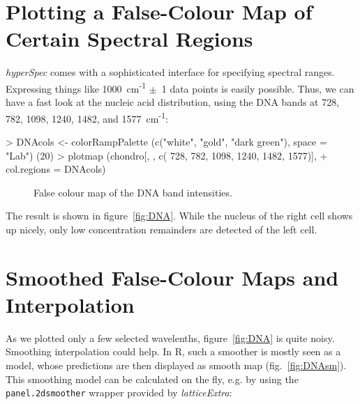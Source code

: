 \documentclass[english, a4paper, 10pt, headings=small, DIV11]{scrartcl}
\renewenvironment{Schunk}{\vspace{0pt}\begin{small}}{\end{small}\vspace{0pt}}
\newcommand{\Rfunction}[2][]{\texorpdfstring{\nohyphens{#1\texttt{#2}}}{#2}}
\newcommand{\Rpackage}[1]{\texorpdfstring{\nohyphens{\textit{#1}}}{#1}}
\newcommand{\Rclass}[1]{\texorpdfstring{\nohyphens{\textit{#1}}}{#1}}
\begin{document}
\section{Plotting a False-Colour Map of Certain Spectral Regions}

\Rclass{hyperSpec} comes with a sophisticated interface for specifying
spectral ranges. Expressing things like 1000~cm\textsuperscript{-1}
$\pm$~1 data points is easily possible. Thus, we can have a fast
look at the nucleic acid distribution, using the DNA bands at 728,
782, 1098, 1240, 1482, and 1577~cm\textsuperscript{-1}:

\begin{Schunk}
\begin{Sinput}
> DNAcols <- colorRampPalette (c("white", "gold", "dark green"), space = "Lab") (20)
> plotmap (chondro[, , c( 728, 782, 1098, 1240, 1482, 1577)],
+        col.regions = DNAcols)
\end{Sinput}
\end{Schunk}
\begin{figure}[tbh]
\caption{False colour map of the DNA band intensities.}
\end{figure}

The result is shown in figure~\ref{fig:DNA}. While the nucleus of
the right cell shows up nicely, only low concentration remainders are detected
of the left cell.

\section{Smoothed False-Colour Maps and Interpolation}
As we plotted only a few selected wavelenths, figure~\ref{fig:DNA} is quite noisy. Smoothing interpolation could help. 
In R, such a smoother is mostly seen as a model, whose predictions are then displayed as smooth map (fig.~\ref{fig:DNAsm}). This smoothing model can be calculated on the fly, 
e.g. by using the \Rfunction{panel.2dsmoother} wrapper provided by \Rpackage{latticeExtra}:
\end{document}
